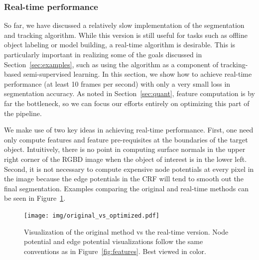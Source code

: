 \documentclass[graybox]{svmult}
\begin{document}
\subsubsection{Real-time performance}
\label{sec:realtime}

So far, we have discussed a relatively slow implementation of the segmentation and tracking algorithm.   While this version is still useful for tasks such as offline object labeling or model building, a real-time algorithm is desirable.  This is particularly important in realizing some of the goals discussed in Section~\ref{sec:examples}, such as using the algorithm as a component of tracking-based semi-supervised learning.  In this section, we show how to achieve real-time performance (\ie at least 10 frames per second) with only a very small loss in segmentation accuracy.  As noted in Section~\ref{sec:quant}, feature computation is by far the bottleneck, so we can focus our efforts entirely on optimizing this part of the pipeline.

We make use of two key ideas in achieving real-time performance.  First, one need only compute features and feature pre-requisites at the boundaries of the target object.  Intuitively, there is no point in computing surface normals in the upper right corner of the RGBD image when the object of interest is in the lower left.  Second, it is not necessary to compute expensive node potentials at every pixel in the image because the edge potentials in the CRF will tend to smooth out the final segmentation.  Examples comparing the original and real-time methods can be seen in Figure~\ref{fig:mask}.

\begin{figure}
  \centering
  \texttt{[image: img/original\_vs\_optimized.pdf]}
  \caption{Visualization of the original method vs the real-time version.  Node potential and edge potential visualizations follow the same conventions as in Figure~\ref{fig:features}.  Best viewed in color.}
  \label{fig:mask}
\end{figure}
\end{document}
